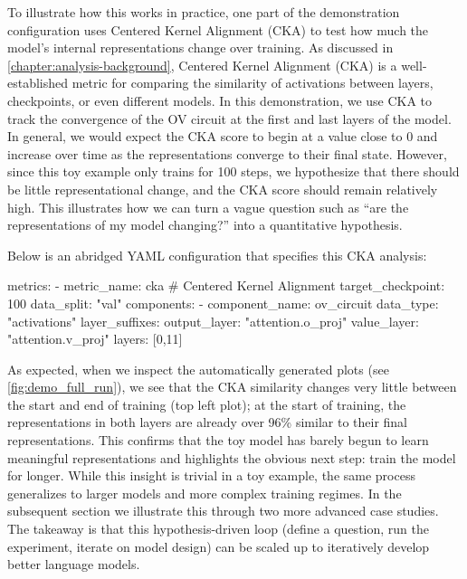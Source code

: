 To illustrate how this works in practice, one part of the demonstration configuration uses Centered Kernel Alignment (CKA) to test how much the model's internal representations change over training. As discussed in \cref{chapter:analysis-background}, Centered Kernel Alignment (CKA) is a well-established metric for comparing the similarity of activations between layers, checkpoints, or even different models. In this demonstration, we use CKA to track the convergence of the OV circuit at the first and last layers of the model. In general, we would expect the CKA score to begin at a value close to 0 and increase over time as the representations converge to their final state. However, since this toy example only trains for 100 steps, we hypothesize that there should be little representational change, and the CKA score should remain relatively high. This illustrates how we can turn a vague question such as “are the representations of my model changing?” into a quantitative hypothesis.

Below is an abridged YAML configuration that specifies this CKA analysis:

\begin{center}
\begin{configlisting}
    metrics:
    - metric_name: cka # Centered Kernel Alignment
      target_checkpoint: 100
      data_split: "val"
      components: 
        - component_name: ov_circuit
          data_type: "activations"
          layer_suffixes: 
            output_layer: "attention.o_proj"
            value_layer: "attention.v_proj"
          layers: [0,11]

\end{configlisting}
\end{center}

As expected, when we inspect the automatically generated plots (see \cref{fig:demo_full_run}), we see that the CKA similarity changes very little between the start and end of training (top left plot); at the start of training, the representations in both layers are already over 96\% similar to their final representations. This confirms that the toy model has barely begun to learn meaningful representations and highlights the obvious next step: train the model for longer. While this insight is trivial in a toy example, the same process generalizes to larger models and more complex training regimes. In the subsequent section we illustrate this through two more advanced case studies. The takeaway is that this hypothesis-driven loop (define a question, run the experiment, iterate on model design) can be scaled up to iteratively develop better language models.

